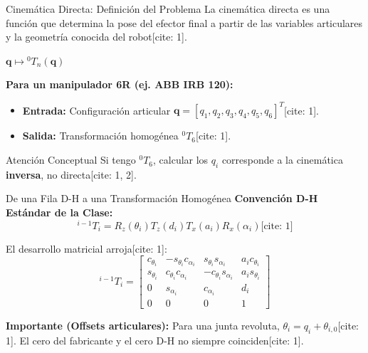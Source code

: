 \documentclass[aspectratio=169, table, xcdraw]{beamer}
\begin{document}
\begin{frame}{Cinemática Directa: Definición del Problema}
    La cinemática directa es una función que determina la pose del efector final a partir de las variables articulares y la geometría conocida del robot[cite: 1].
    
    \vspace{0.3cm}
    \begin{center}
        \large
        $\boxed{\mathbf{q} \longmapsto {}^{0}T_n(\mathbf{q})}$
    \end{center}
    \vspace{0.3cm}
    
    \textbf{Para un manipulador 6R (ej. ABB IRB 120):}
    \begin{itemize}
        \item \textbf{Entrada:} Configuración articular $\mathbf{q} = [q_1, q_2, q_3, q_4, q_5, q_6]^T$[cite: 1].
        \item \textbf{Salida:} Transformación homogénea ${}^{0}T_6$[cite: 1].
    \end{itemize}
    
    \begin{alertblock}{Atención Conceptual}
        Si tengo ${}^{0}T_6$, calcular los $q_i$ corresponde a la cinemática \textbf{inversa}, no directa[cite: 1, 2].
    \end{alertblock}
\end{frame}

\begin{frame}{De una Fila D-H a una Transformación Homogénea}
    \textbf{Convención D-H Estándar de la Clase:}
    \begin{equation*}
        \boxed{ {}^{i-1}T_i = R_z(\theta_i) T_z(d_i) T_x(a_i) R_x(\alpha_i) } \text{[cite: 1]}
    \end{equation*}

    El desarrollo matricial arroja[cite: 1]:
    \begin{equation*}
        {}^{i-1}T_i =
        \begin{bmatrix}
        c_{\theta_i} & -s_{\theta_i}c_{\alpha_i} & s_{\theta_i}s_{\alpha_i} & a_i c_{\theta_i} \\
        s_{\theta_i} & c_{\theta_i}c_{\alpha_i} & -c_{\theta_i}s_{\alpha_i} & a_i s_{\theta_i} \\
        0 & s_{\alpha_i} & c_{\alpha_i} & d_i \\
        0 & 0 & 0 & 1
        \end{bmatrix}
    \end{equation*}

    \textbf{Importante (Offsets articulares):} Para una junta revoluta, $\theta_i = q_i + \theta_{i,0}$[cite: 1]. El cero del fabricante y el cero D-H no siempre coinciden[cite: 1].
\end{frame}
\end{document}
